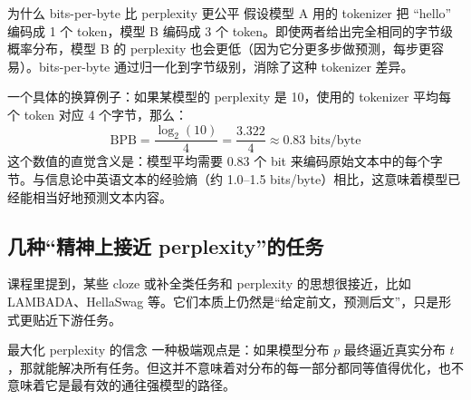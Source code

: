 \begin{importantbox}{为什么 bits-per-byte 比 perplexity 更公平}
假设模型 A 用的 tokenizer 把 ``hello'' 编码成 1 个 token，模型 B 编码成 3 个 token。即使两者给出完全相同的字节级概率分布，模型 B 的 perplexity 也会更低（因为它分更多步做预测，每步更容易）。bits-per-byte 通过归一化到字节级别，消除了这种 tokenizer 差异。
\end{importantbox}

一个具体的换算例子：如果某模型的 perplexity 是 10，使用的 tokenizer 平均每个 token 对应 4 个字节，那么：
\[
\text{BPB} = \frac{\log_2(10)}{4} = \frac{3.322}{4} \approx 0.83 \text{ bits/byte}
\]
这个数值的直觉含义是：模型平均需要 0.83 个 bit 来编码原始文本中的每个字节。与信息论中英语文本的经验熵（约 1.0--1.5 bits/byte）相比，这意味着模型已经能相当好地预测文本内容。

\subsection{几种``精神上接近 perplexity''的任务}

课程里提到，某些 cloze 或补全类任务和 perplexity 的思想很接近，比如 LAMBADA、HellaSwag 等。它们本质上仍然是“给定前文，预测后文”，只是形式更贴近下游任务。

\begin{warningbox}{最大化 perplexity 的信念}
一种极端观点是：如果模型分布 $p$ 最终逼近真实分布 $t$，那就能解决所有任务。但这并不意味着对分布的每一部分都同等值得优化，也不意味着它是最有效的通往强模型的路径。
\end{warningbox}

